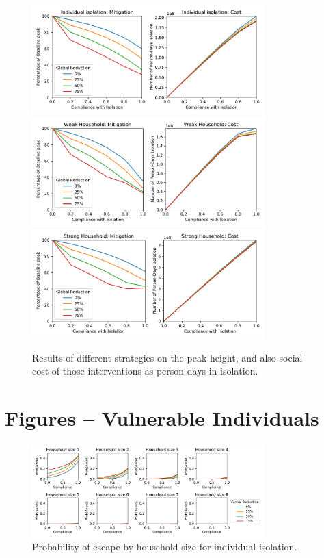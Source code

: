 \documentclass[10pt,a4paper]{article}
\begin{document}
\begin{figure}[H]
\begin{center}
\includegraphics[width=0.8\textwidth]{mit_costs.pdf}\\
\includegraphics[width=0.8\textwidth]{mit_costs_weak.pdf}\\
\includegraphics[width=0.8\textwidth]{mit_costs_strong.pdf}
\end{center}
\caption{Results of different strategies on the peak height, and also
social cost of those interventions as person-days in isolation.}
\end{figure}

\clearpage

\section{Figures -- Vulnerable Individuals}

\begin{figure}[H]
\begin{center}
\includegraphics[width=0.8\textwidth]{prob_avoid.pdf}
\end{center}
\caption{Probability of escape by household size for individual isolation.}
\end{figure}
\end{document}
